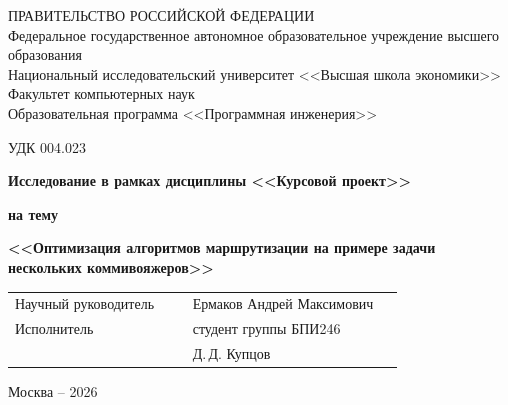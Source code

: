 \begin{titlepage}

{
\begin{center}
ПРАВИТЕЛЬСТВО РОССИЙСКОЙ ФЕДЕРАЦИИ\\
Федеральное государственное автономное образовательное учреждение высшего образования\\
Национальный исследовательский университет <<Высшая школа экономики>>\\
\bigskip
Факультет компьютерных наук\\
Образовательная программа <<Программная инженерия>>
\end{center}
}

\vspace{4em}

\begin{center}
УДК 004.023

\vspace{2em}

\textbf{Исследование в рамках дисциплины <<Курсовой проект>>}

\vspace{1em}

\textbf{на тему}

\vspace{0.5em}

\textbf{<<Оптимизация алгоритмов маршрутизации на примере задачи нескольких коммивояжеров>>}
\end{center}

\vspace{5em}

\noindent
\begin{tabular}{p{0.42\linewidth}p{0.5\linewidth}}
Научный руководитель & Ермаков Андрей Максимович \\
Исполнитель & студент группы БПИ246 \\
& Д.\,Д. Купцов \\
\end{tabular}

\vspace{\fill}

\begin{center}
Москва -- 2026
\end{center}

\end{titlepage}
